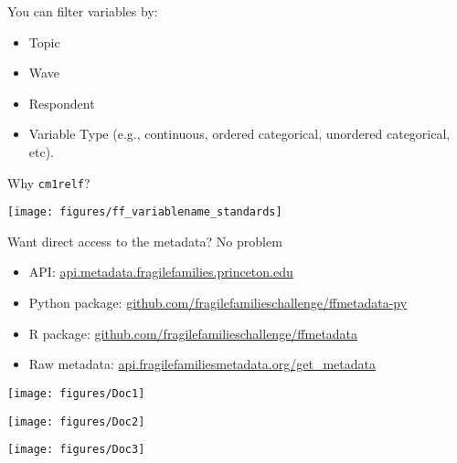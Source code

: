 \documentclass{beamer}
\begin{document}
\begin{frame}

You can filter variables by:
\begin{itemize}
\item Topic
\item Wave
\item Respondent
\item Variable Type (e.g., continuous, ordered categorical, unordered categorical, etc).
\end{itemize}

\end{frame}	
\begin{frame}

Why \texttt{cm1relf}? \pause

\begin{center}
\texttt{[image: figures/ff\_variablename\_standards]}
\end{center}

\end{frame}
\begin{frame}

Want direct access to the metadata?  \pause No problem

\begin{itemize}
\item API: \url{api.metadata.fragilefamilies.princeton.edu}
\item Python package: \url{github.com/fragilefamilieschallenge/ffmetadata-py}
\item R package: \url{github.com/fragilefamilieschallenge/ffmetadata}
\item Raw metadata: \url{api.fragilefamiliesmetadata.org/get_metadata}
\end{itemize}

\end{frame}
\begin{frame}

\centering\texttt{[image: figures/Doc1]}

\end{frame}
\begin{frame}

\centering\texttt{[image: figures/Doc2]}

\end{frame}
\begin{frame}

\centering\texttt{[image: figures/Doc3]}

\end{frame}
\end{document}
